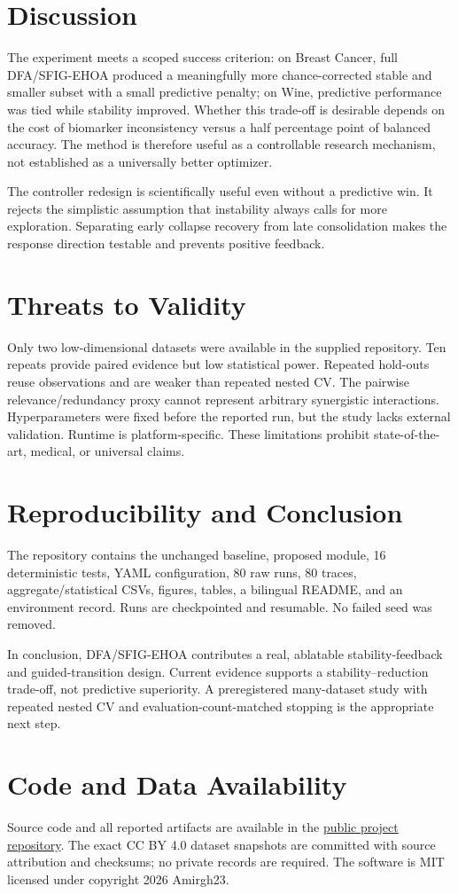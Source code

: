\documentclass[11pt]{article}
\begin{document}
\section{Discussion}
The experiment meets a scoped success criterion: on Breast Cancer, full
DFA/SFIG-EHOA produced a meaningfully more chance-corrected stable and smaller
subset with a small predictive penalty; on Wine, predictive performance was
tied while stability improved. Whether this trade-off is desirable depends on
the cost of biomarker inconsistency versus a half percentage point of balanced
accuracy. The method is therefore useful as a controllable research mechanism,
not established as a universally better optimizer.

The controller redesign is scientifically useful even without a predictive
win. It rejects the simplistic assumption that instability always calls for
more exploration. Separating early collapse recovery from late consolidation
makes the response direction testable and prevents positive feedback.

\section{Threats to Validity}
Only two low-dimensional datasets were available in the supplied repository.
Ten repeats provide paired evidence but low statistical power. Repeated
hold-outs reuse observations and are weaker than repeated nested CV. The
pairwise relevance/redundancy proxy cannot represent arbitrary synergistic
interactions. Hyperparameters were fixed before the reported run, but the
study lacks external validation. Runtime is platform-specific. These limitations
prohibit state-of-the-art, medical, or universal claims.

\section{Reproducibility and Conclusion}
The repository contains the unchanged baseline, proposed module, 16 deterministic
tests, YAML configuration, 80 raw runs, 80 traces, aggregate/statistical CSVs,
figures, tables, a bilingual README, and an environment record. Runs are
checkpointed and resumable. No failed seed was removed.

In conclusion, DFA/SFIG-EHOA contributes a real, ablatable stability-feedback
and guided-transition design. Current evidence supports a stability--reduction
trade-off, not predictive superiority. A preregistered many-dataset study with
repeated nested CV and evaluation-count-matched stopping is the appropriate
next step.

\section*{Code and Data Availability}
Source code and all reported artifacts are available in the
\href{https://github.com/Amirgh23/dfa-ehoa-research}{public project repository}.
The exact CC BY 4.0 dataset snapshots are committed with source attribution and
checksums; no private records are required. The software is MIT licensed
under copyright 2026 Amirgh23.

\small


\end{document}
